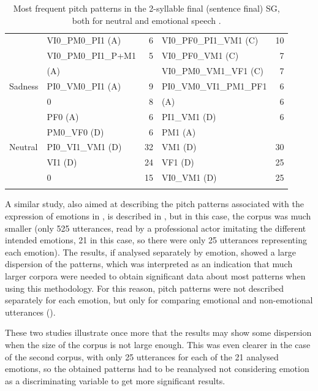 \documentclass[output=paper]{langsci/langscibook}
\begin{document}
\begin{table}[p]
\begin{tabular}{llrlr}
         & VI0\_PM0\_PI1 (A)      & 6               & VI0\_PF0\_PI1\_VM1 (C)  & 10              \\
         & VI0\_PM0\_PI1\_P+M1    & 5               & VI0\_PF0\_VM1 (C)       & 7               \\
         & (A)                    &                 & VI0\_PM0\_VM1\_VF1 (C)  & 7               \\
\midrule
Sadness  & PI0\_VM0\_PI1 (A)      & 9               & PI0\_VM0\_VI1\_PM1\_PF1 & 6               \\
         & 0                      & 8               & (A)                     & 6               \\
         & PF0 (A)                & 6               & PI1\_VM1 (D)            & 6               \\
         & PM0\_VF0 (D)           & 6               & PM1 (A)                 &                 \\
\midrule
Neutral  & PI0\_VI1\_VM1 (D)      & 32              & VM1 (D)                 & 30              \\
         & VI1 (D)                & 24              & VF1 (D)                 & 25              \\
         & 0                      & 15              & VI0\_VM1 (D)            & 25  \\
\lspbottomrule         
\end{tabular}
\caption{Most frequent pitch patterns in the 2-syllable final (sentence final) SG, both for neutral and emotional speech \citep{Garrido2011}.}
\label{tab:gar:12}
\end{table}


A similar study, also aimed at describing the pitch patterns associated with the expression of emotions in , is described in \citet{Laplaza2014}, but in this case, the corpus was much smaller (only 525 utterances, read by a professional actor imitating the different intended emotions, 21 in this case, so there were only 25 utterances representing each emotion). The results, if analysed separately by emotion, showed a large dispersion of the patterns, which was interpreted as an indication that much larger corpora were needed to obtain significant data about most patterns when using this methodology. For this reason, pitch patterns were not described separately for each emotion, but only for comparing emotional and non-emotional utterances ().



These two studies illustrate once more that the results may show some dispersion when the size of the corpus is not large enough. This was even clearer in the case of the second corpus, with only 25 utterances for each of the 21 analysed emotions, so the obtained patterns had to be reanalysed not considering emotion as a discriminating variable to get more significant results.
\end{document}
